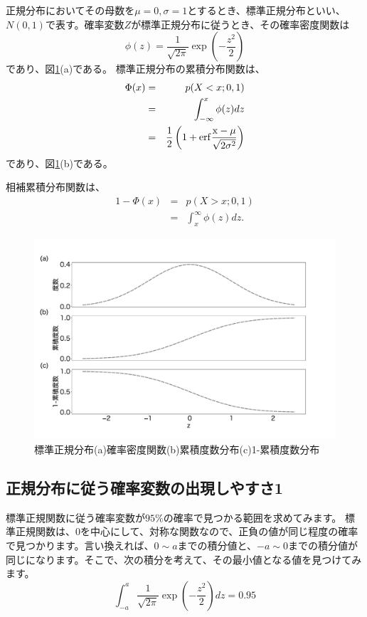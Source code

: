 正規分布においてその母数を$\mu=0,\sigma=1$とするとき、標準正規分布といい、$N(0,1)$で表す。確率変数$Z$が標準正規分布に従うとき、その確率密度関数は
\begin{equation}
\phi(z) = \frac{1}{\sqrt{2\pi}}\exp(-\frac{z^2}{2})
\end{equation}
であり、図\ref{fig:standard_normal_distribution}(a)である。
標準正規分布の累積分布関数は、
\begin{eqnarray}
\Phi(x) &=& p(X<x; 0,1) \\
    &=& \int_{-\infty}^x \phi(z)dz \\
    &=& \frac{1}{2}\left(1+\rm{erf}\frac{x-\mu}{\sqrt{2\sigma^2}}\right)
\end{eqnarray}
であり、図\ref{fig:standard_normal_distribution}(b)である。

相補累積分布関数は、
\begin{eqnarray}
    1-\Phi(x) &=& p(X>x; 0,1) \\
        &=& \int_{x}^{\infty} \phi(z)dz.
\end{eqnarray}


\begin{figure}
    \begin{center}
        \includegraphics[width=15cm]{./image/02_/standard_normal.pdf}
        \caption{標準正規分布(a)確率密度関数(b)累積度数分布(c)1-累積度数分布}
        \label{fig:standard_normal_distribution}

    \end{center}
\end{figure}
    

\subsection{正規分布に従う確率変数の出現しやすさ1}
標準正規関数に従う確率変数が$95\%$の確率で見つかる範囲を求めてみます。
標準正規関数は、0を中心にして、対称な関数なので、正負の値が同じ程度の確率で見つかります。言い換えれば、$0\sim a$までの積分値と、$-a\sim 0$までの積分値が同じになります。そこで、次の積分を考えて、その最小値となる値を見つけてみます。
\begin{equation}
\int_{-a}^{a} \frac{1}{\sqrt{2\pi}}\exp(-\frac{z^2}{2}) dz = 0.95
\end{equation}


